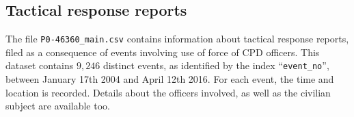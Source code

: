 \subsection{Tactical response reports}

The file \texttt{P0-46360\_main.csv} contains information about tactical response reports, filed as a consequence of  events involving use of force of CPD officers. This dataset contains $9{,}246$ distinct events, as identified by the index ``\texttt{event\_no}'', between January 17th 2004 and April 12th 2016. For each event, the time and location is recorded. Details about the officers involved, as well as the civilian subject are available too. 